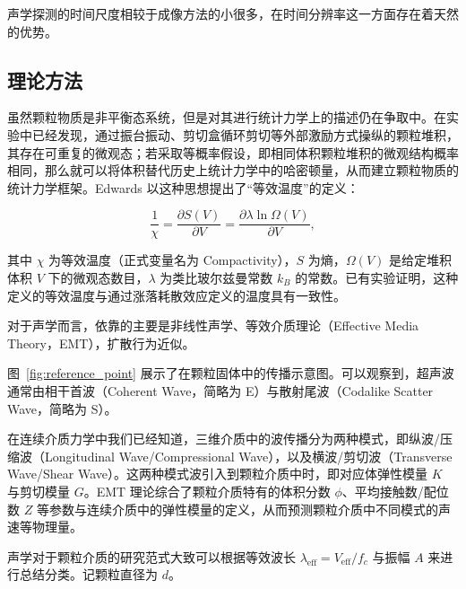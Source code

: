声学探测的时间尺度相较于成像方法的小很多，在时间分辨率这一方面存在着天然的优势。


\subsection{理论方法}

虽然颗粒物质是非平衡态系统，但是对其进行统计力学上的描述仍在争取中。在实验中已经发现，通过振台振动、剪切盒循环剪切等外部激励方式操纵的颗粒堆积，其存在可重复的微观态；若采取等概率假设，即相同体积颗粒堆积的微观结构概率相同，那么就可以将体积替代历史上统计力学中的哈密顿量，从而建立颗粒物质的统计力学框架。Edwards 以这种思想提出了“等效温度”的定义：

\begin{equation}
  \frac{1}{\chi} = \frac{\partial S(V)}{\partial V} = \frac{\partial \lambda\ln{\Omega(V)}}{\partial V},
\end{equation}

其中 $\chi$ 为等效温度（正式变量名为 Compactivity），$S$ 为熵，$\Omega(V)$ 是给定堆积体积 $V$ 下的微观态数目，$\lambda$ 为类比玻尔兹曼常数 $k_{B}$ 的常数。已有实验证明，这种定义的等效温度与通过涨落耗散效应定义的温度具有一致性。


对于声学而言，依靠的主要是非线性声学\cite{10.1029/93JB02974}、等效介质理论（Effective Media Theory，EMT），扩散行为近似。

图~\ref{fig:reference_point} 展示了在颗粒固体中的传播示意图。可以观察到，超声波通常由相干首波（Coherent Wave，简略为 E）与散射尾波（Codalike Scatter Wave，简略为 S）。 %

在连续介质力学中我们已经知道，三维介质中的波传播分为两种模式，即纵波/压缩波（Longitudinal Wave/Compressional Wave），以及横波/剪切波（Transverse Wave/Shear Wave）。这两种模式波引入到颗粒介质中时，即对应体弹性模量 $K$ 与剪切模量 $G$。EMT 理论综合了颗粒介质特有的体积分数 $\phi$、平均接触数/配位数 $Z$ 等参数与连续介质中的弹性模量的定义，从而预测颗粒介质中不同模式的声速等物理量。

声学对于颗粒介质的研究范式大致可以根据等效波长 $\lambda_{\text{eff}} = V_{\text{eff}}/f_{c}$ 与振幅 $A$ 来进行总结分类。记颗粒直径为 $d$。

